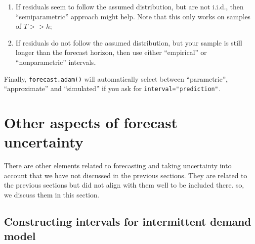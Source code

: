 \documentclass[
]{book}
\providecommand{\tightlist}{%
  \setlength{\itemsep}{0pt}\setlength{\parskip}{0pt}}
\theoremstyle{definition}
\theoremstyle{definition}
\theoremstyle{definition}
\theoremstyle{definition}
\theoremstyle{remark}
\begin{document}
\begin{enumerate}
\def\labelenumi{\arabic{enumi}.}
\setcounter{enumi}{1}
\tightlist
\item
  If residuals seem to follow the assumed distribution, but are not i.i.d., then ``semiparametric'' approach might help. Note that this only works on samples of \(T>>h\);
\item
  If residuals do not follow the assumed distribution, but your sample is still longer than the forecast horizon, then use either ``empirical'' or ``nonparametric'' intervals.
\end{enumerate}

Finally, \texttt{forecast.adam()} will automatically select between ``parametric'', ``approximate'' and ``simulated'' if you ask for \texttt{interval="prediction"}.

\hypertarget{forecastingADAMOther}{%
\section{Other aspects of forecast uncertainty}\label{forecastingADAMOther}}

There are other elements related to forecasting and taking uncertainty into account that we have not discussed in the previous sections. They are related to the previous sections but did not align with them well to be included there. so, we discuss them in this section.

\hypertarget{constructing-intervals-for-intermittent-demand-model}{%
\subsection{Constructing intervals for intermittent demand model}\label{constructing-intervals-for-intermittent-demand-model}}
\end{document}
